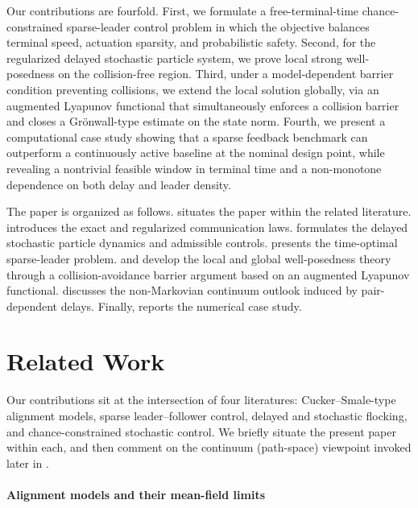 \documentclass[pdflatex,sn-mathphys-num]{sn-jnl}%
\numberwithin{equation}{section}
\theoremstyle{thmstyleone}%
\theoremstyle{remark}
\theoremstyle{definition}
\begin{document}
Our contributions are fourfold. First, we formulate a free-terminal-time
chance-constrained sparse-leader control problem in which the objective
balances terminal speed, actuation sparsity, and probabilistic safety.
Second, for the regularized delayed stochastic particle system, we prove
local strong well-posedness on the collision-free region. Third, under a
model-dependent barrier condition preventing collisions, we extend the local
solution globally, via an augmented Lyapunov functional that
simultaneously enforces a collision barrier and closes a Gr\"onwall-type
estimate on the state norm. Fourth, we present a computational case study
showing that a sparse feedback benchmark can outperform a continuously active
baseline at the nominal design point, while revealing a nontrivial feasible
window in terminal time and a non-monotone dependence on both delay and
leader density.

The paper is organized as follows.  situates the paper
within the related literature.  introduces the exact and
regularized communication laws.  formulates the delayed
stochastic particle dynamics and admissible controls. 
presents the time-optimal sparse-leader problem.  and
 develop the local and global well-posedness
theory through a collision-avoidance barrier argument based on an augmented
Lyapunov functional.  discusses the non-Markovian
continuum outlook induced by pair-dependent delays. Finally,
 reports the numerical case study.
\section{Related Work}
\label{sec:related}

Our contributions sit at the intersection of four literatures: Cucker--Smale-type
alignment models, sparse leader--follower control, delayed and stochastic
flocking, and chance-constrained stochastic control. We briefly situate the
present paper within each, and then comment on the continuum (path-space)
viewpoint invoked later in .

\paragraph{Alignment models and their mean-field limits}
\end{document}
